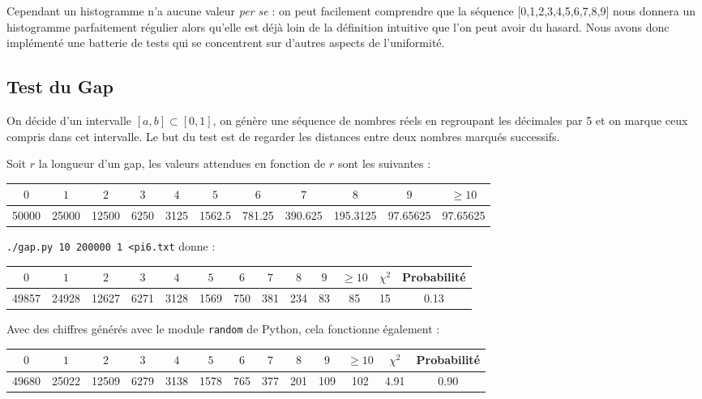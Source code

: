 \documentclass[12pt,a4paper]{article}
\begin{document}
Cependant un histogramme n'a aucune valeur \textit{per se} :
on peut facilement comprendre que la séquence [0,1,2,3,4,5,6,7,8,9]
nous donnera un histogramme parfaitement régulier alors qu'elle est déjà loin
de la définition intuitive que l'on peut avoir du hasard.
Nous avons donc implémenté une batterie de tests qui se concentrent
sur d'autres aspects de l'uniformité.

\subsection{Test du Gap}
On décide d'un intervalle $[a,b] \subset [0,1]$,
on génère une séquence de nombres réels en regroupant les décimales par 5
et on marque ceux compris dans cet intervalle. Le but du test est de regarder les
distances entre deux nombres marqués successifs.

Soit $r$ la longueur d'un gap,
les valeurs attendues en fonction de $r$ sont les suivantes :
\begin{center}
\begin{tabular}{c|c|c|c|c|c|c|c|c|c|c}
$0$ & $1$ & $2$ & $3$ & $4$ & $5$ & $6$ & $7$ & $8$ & $9$ & $\geq 10$ \\ \hline
50000 & 25000 & 12500 & 6250 & 3125 & 1562.5 & 781.25 & 390.625 &
	195.3125 & 97.65625 & 97.65625
\end{tabular}
\end{center}

\texttt{./gap.py 10 200000 1 <pi6.txt} donne :
\begin{center}
\begin{tabular}{c|c|c|c|c|c|c|c|c|c|c|c|c}
$0$ & $1$ & $2$ & $3$ & $4$ & $5$ & $6$ & $7$ & $8$ & $9$ & $\geq 10$ &
	$\chi^2$ & Probabilité \\ \hline
49857 & 24928 & 12627 & 6271 & 3128 & 1569 & 750 & 381 & 234 & 83 & 85 &
	15 &  0.13
\end{tabular}
\end{center}

Avec des chiffres générés avec le module \texttt{random} de Python,
cela fonctionne également :
\begin{center}
\begin{tabular}{c|c|c|c|c|c|c|c|c|c|c|c|c}
$0$ & $1$ & $2$ & $3$ & $4$ & $5$ & $6$ & $7$ & $8$ & $9$ & $\geq 10$ &
	$\chi^2$ & Probabilité \\ \hline
49680 & 25022 & 12509 & 6279 & 3138 & 1578 & 765 & 377 & 201 & 109 & 102 &
	4.91 &  0.90
\end{tabular}
\end{center}
\end{document}
